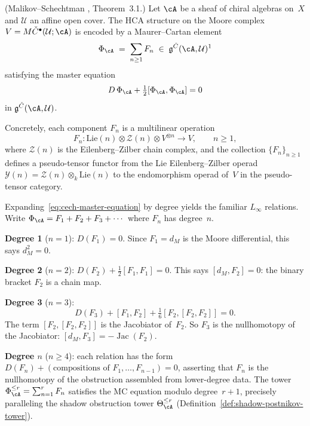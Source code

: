 \begin{theorem}
\label{thm:cech-hca}
\textup{(Malikov--Schechtman \cite{MS24}, Theorem~3.1.)}
Let $\cA$ be a sheaf of chiral algebras on~$X$ and
$\mathcal{U}$ an affine open cover. The HCA structure on the Moore
complex $V = M\check{C}^\bullet(\mathcal{U};\cA)$ is encoded by a
Maurer--Cartan element
\begin{equation}\label{eq:cech-mc-element}
\Phi_\cA
 \;=\; \sum_{n \geq 1} F_n
 \;\in\;
 \mathfrak{g}^{\check{C}}(\cA,\mathcal{U})^1
\end{equation}
satisfying the master equation
\begin{equation}\label{eq:cech-master-equation}
D\,\Phi_\cA + \tfrac{1}{2}[\Phi_\cA,\Phi_\cA] = 0
\end{equation}
in $\mathfrak{g}^{\check{C}}(\cA,\mathcal{U})$.

Concretely, each component $F_n$ is a multilinear operation
\[
F_n\colon
 \mathrm{Lie}(n) \otimes \mathcal{Z}(n)
 \otimes V^{\otimes n}
 \longrightarrow V,
 \qquad n \geq 1,
\]
where $\mathcal{Z}(n)$ is the Eilenberg--Zilber chain complex, and
the collection $\{F_n\}_{n \geq 1}$ defines a pseudo-tensor
functor from the Lie Eilenberg--Zilber operad
$\mathcal{Y}(n) = \mathcal{Z}(n) \otimes_k \mathrm{Lie}(n)$
to the endomorphism operad of~$V$ in the pseudo-tensor category.
\end{theorem}

\begin{remark}
\label{rem:cech-mc-degree}
Expanding~\eqref{eq:cech-master-equation} by degree yields the
familiar $L_\infty$ relations.
Write $\Phi_\cA = F_1 + F_2 + F_3 + \cdots$ where $F_n$ has
degree~$n$.

\smallskip\noindent
\textbf{Degree 1} ($n=1$): $D(F_1) = 0$. Since
$F_1 = d_M$ is the Moore differential, this says $d_M^2 = 0$.

\smallskip\noindent
\textbf{Degree 2} ($n=2$):
$D(F_2) + \tfrac{1}{2}[F_1,F_1] = 0$.
This says $[d_M, F_2] = 0$: the binary bracket $F_2$ is a chain map.

\smallskip\noindent
\textbf{Degree 3} ($n=3$):
\begin{equation}\label{eq:cech-degree-3}
D(F_3) + [F_1,F_2] + \tfrac{1}{6}[F_2,[F_2,F_2]] = 0.
\end{equation}
The term $[F_2,[F_2,F_2]]$ is the Jacobiator of~$F_2$. So $F_3$
is the nullhomotopy of the Jacobiator: $[d_M, F_3] =
-\operatorname{Jac}(F_2)$.

\smallskip\noindent
\textbf{Degree $n$} ($n \geq 4$): each relation has the form
$D(F_n) + (\text{compositions of } F_1,\ldots,F_{n-1}) = 0$,
asserting that $F_n$ is the nullhomotopy of the obstruction
assembled from lower-degree data. The tower
$\Phi_\cA^{\leq r} = \sum_{n=1}^r F_n$ satisfies the MC equation
modulo degree~$r{+}1$, precisely paralleling the shadow obstruction
tower $\Theta_\cA^{\leq r}$
(Definition~\ref{def:shadow-postnikov-tower}).
\end{remark}


